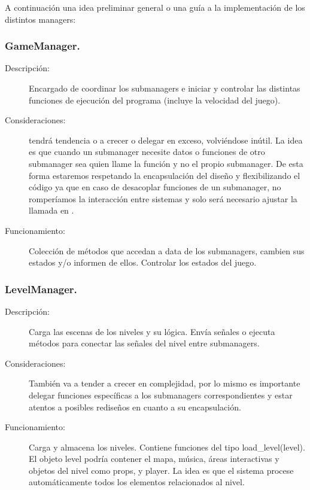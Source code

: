 A continuación una idea preliminar general o una guía a la implementación de los distintos managers:

\subsubsection{GameManager.}\label{modelado:gamemanager}

\begin{description}%
	\item[Descripción:] Encargado de coordinar los submanagers e iniciar y controlar las distintas funciones de ejecución del programa (incluye la velocidad del juego).
	
	\item[Consideraciones:]  tendrá tendencia o a crecer o delegar en exceso, volviéndose inútil. La idea es que cuando un submanager necesite datos o funciones de otro submanager sea  quien llame la función y no el propio submanager. De esta forma estaremos respetando la encapsulación del diseño y flexibilizando el código ya que en caso de desacoplar funciones de un submanager, no romperíamos la interacción entre sistemas y solo será necesario ajustar la llamada en .
	
	\item[Funcionamiento:] Colección de métodos que accedan a data de los submanagers, cambien sus estados y/o informen de ellos. Controlar los estados del juego.
\end{description}
	
\subsubsection{LevelManager.}\label{modelado:levelmanager}
\begin{description}
	\item[Descripción:]	Carga las escenas  de los niveles y su lógica. Envía señales o ejecuta métodos para conectar las señales del nivel entre submanagers.
	
	\item[Consideraciones:] También va a tender a crecer en complejidad, por lo mismo es importante delegar funciones específicas a los submanagers correspondientes y estar atentos a posibles rediseños en cuanto a su encapsulación.
	
	\item[Funcionamiento:] Carga y almacena los niveles. Contiene funciones del tipo load\_level(level). El objeto level podría contener el mapa, música, áreas interactivas y objetos del nivel como props,  y player. La idea es que el sistema procese automáticamente todos los elementos relacionados al nivel.
\end{description}
	

